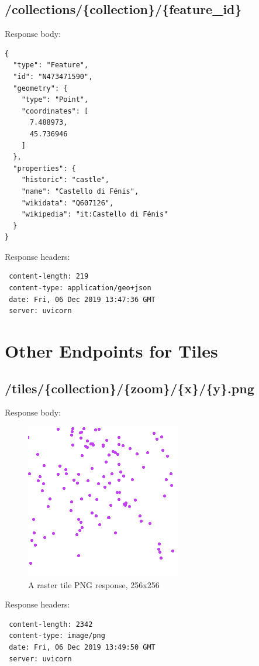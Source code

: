 \subsection{/collections/\{collection\}/\{feature\_id\}}
Response body:
\begin{verbatim}
{
  "type": "Feature",
  "id": "N473471590",
  "geometry": {
    "type": "Point",
    "coordinates": [
      7.488973,
      45.736946
    ]
  },
  "properties": {
    "historic": "castle",
    "name": "Castello di Fénis",
    "wikidata": "Q607126",
    "wikipedia": "it:Castello di Fénis"
  }
}
\end{verbatim}
Response headers:
\begin{verbatim}
 content-length: 219 
 content-type: application/geo+json 
 date: Fri, 06 Dec 2019 13:47:36 GMT 
 server: uvicorn 
\end{verbatim}
\newpage
\section{Other Endpoints for Tiles}
\subsection{/tiles/\{collection\}/\{zoom\}/\{x\}/\{y\}.png}
Response body:\\
\begin{figure}[H]
	\begin{center}
	\includegraphics[width=256px, height=256px]{./Images/Appendices/raster_tile_response_body.png}
	\end{center}
	\caption{A raster tile PNG response, 256x256}
\end{figure}
Response headers:
\begin{verbatim}
 content-length: 2342 
 content-type: image/png 
 date: Fri, 06 Dec 2019 13:49:50 GMT 
 server: uvicorn 
\end{verbatim}
\newpage
